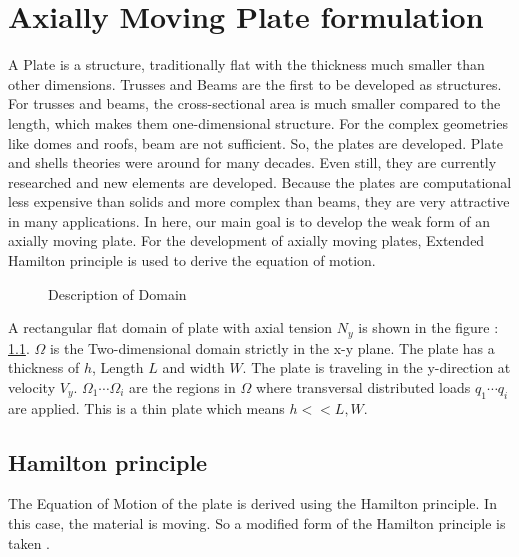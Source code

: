 \documentclass[main.tex]{subfiles}
\begin{document}
\chapter{Axially Moving Plate formulation}

A Plate is a structure, traditionally flat with the thickness much smaller than other dimensions. Trusses and Beams are the first to be developed as structures. For trusses and beams, the cross-sectional area is much smaller compared to the length, which makes them one-dimensional structure. For the complex geometries like domes and roofs, beam are not sufficient. So, the plates are developed. Plate and shells theories were around for many decades. Even still, they are currently researched and new elements are developed. Because the plates are computational less expensive than solids and more complex than beams, they are very attractive in many applications.  In here, our main goal is to develop the weak form of an axially moving plate. For the development of axially moving plates, Extended Hamilton principle is used to derive the equation of motion.  


\begin{figure}[ht!]
\centering
\caption{Description of Domain}
\label{fig:Domain}
\end{figure}

A rectangular flat domain of plate with axial tension $N_y $ is shown in the figure : \ref{fig:Domain}. $\Omega$ is the Two-dimensional domain strictly in the x-y plane. The plate has a thickness of $h$, Length $L$ and width $W$. The plate is traveling in the y-direction at velocity $V_y$. $\Omega_1 \cdots \Omega_i$ are the regions in $\Omega$ where transversal distributed loads $q_1 \cdots q_i$ are applied. This is a thin plate which means $h << L,W $. 

 \section{Hamilton principle}
The Equation of Motion of the plate is derived using the Hamilton principle. In this case, the material is moving. So a modified form of the Hamilton principle is taken \cite{HAM_MASS_VAR}.
\end{document}
